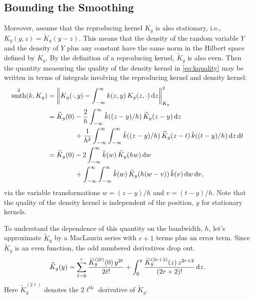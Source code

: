 \documentclass[letterpaper]{amsart}
\newcommand{\KY}{K_y}
\newcommand{\tKY}{\widetilde{K}_y}
\newcommand{\tk}{\tilde{k}}
\DeclareMathOperator{\smooth}{smth}
\begin{document}
\subsection{Bounding the Smoothing} Moreover, assume that the reproducing kernel $\KY$ is also stationary, i.e., $\KY(y,z) = \tKY(y-z)$. This means that the density of the random variable $Y$ and the density of $Y$ plus any constant have the same norm in the Hilbert space defined by $\KY$.  By the definition of a reproducing kernel, $\tKY$ is also even. Then the quantity measuring the quality of the density kernel in \eqref{eq:kquality} may be written in terms of integrals involving the reproducing kernel and density kernel:
\begin{align*}
	\smooth^2(k,\KY) & = \norm[\KY]{\KY(\cdot,y) - \int_{-\infty}^{\infty} k(z,y) \, \KY(z,\cdot) \, \dif z}^2 \\
	&=  \tKY(0) -  \frac 2h \int_{-\infty}^{\infty} \tk((z-y)/h) \, \tKY(z-y) \, \dif z \\
	& \qquad \qquad + \frac 1{h^2} \int_{-\infty}^{\infty} \int_{-\infty}^{\infty}  \tk((z-y)/h)  \, \tKY(z-t) \, \tk((t-y)/h) \, \dif z \, \dif t \\
	&=   \tKY(0) - 2 \int_{-\infty}^{\infty} \tk(w) \, \tKY(hw) \, \dif w \\
	& \qquad \qquad + \int_{-\infty}^{\infty} \int_{-\infty}^{\infty}  \tk(w) \, \tKY(h(w-v)) \, \tk(v)\, \dif w \, \dif v,
\end{align*}
via the variable transformations $w = (z-y)/h$ and $v = (t-y)/h$. Note that the quality of the density kernel is independent of the position, $y$ for stationary kernels.

To understand the dependence of this quantity on the bandwidth, $h$, let's approximate $\tKY$ by a MacLaurin series with $r+1$ terms plus an error term.  Since $\tKY$ is an even function, the odd numbered derivatives drop out.
\begin{equation*}
	\tKY(y)  = \sum_{\ell = 0}^{r} \frac{\tKY^{(2\ell)}(0) \, y^{2\ell}}{2\ell!} + \int_0^y \frac{\tKY^{(2r+2)}(z) \,  z^{2r+2}}{(2r+2)!} \, \dif z.
\end{equation*}
Here $\tKY^{(2\ell)}$ denotes the $2\ell^{\text{th}}$ derivative of $\tKY$.
\end{document}
